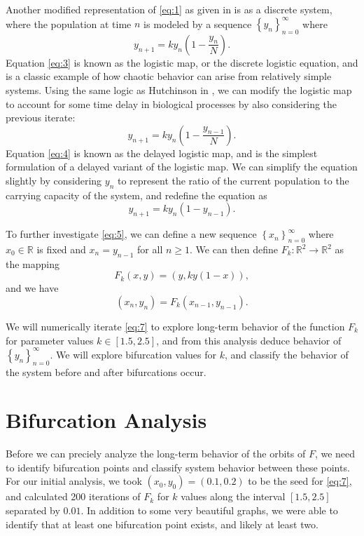 \documentclass[11pt, letterpaper]{article}
\begin{document}
Another modified representation of \eqref{eq:1} as given in \cite{text} is as a discrete system, where the population at time $n$ is modeled by a sequence $\left\{ y_{n} \right\}_{n=0}^\infty $ where
\begin{equation}\label{eq:3}
	y_{n+1}=ky_n\left( 1-\frac{y_n}{N} \right)
.\end{equation}
Equation \eqref{eq:3} is known as the logistic map, or the discrete logistic equation, and is a classic example of how chaotic behavior can arise from relatively simple systems. Using the same logic as Hutchinson in \cite{hutchinson}, we can modify the logistic map to account for some time delay in biological processes by also considering the previous iterate:
\begin{equation}\label{eq:4}
	y_{n+1}=ky_n\left( 1-\frac{y_{n-1}}{N} \right) 
.\end{equation}
Equation \eqref{eq:4} is known as the delayed logistic map, and is the simplest formulation of a delayed variant of the logistic map. We can simplify the equation slightly by considering $y_n$ to represent the ratio of the current population to the carrying capacity of the system, and redefine the equation as
\begin{equation}\label{eq:5}
	y_{n+1}=ky_n\left( 1-y_{n-1} \right) 
.\end{equation}

To further investigate \eqref{eq:5}, we can define a new sequence $\left\{ x_{n} \right\}_{n=0}^\infty $ where $x_0\in\mathbb{R}$ is fixed and $x_{n}=y_{n-1}$ for all $n\geq 1$. We can then define $F_k : \mathbb{R}^2 \to \mathbb{R}^2$ as the mapping
\begin{equation}\label{eq:6}
	F_k(x,y)=\left( y,ky\left( 1-x \right)  \right) 
,\end{equation}
and we have
\begin{equation}\label{eq:7}
	\left( x_n,y_n \right) =F_k(x_{n-1},y_{n-1})
.\end{equation}

We will numerically iterate \eqref{eq:7} to explore long-term behavior of the function $F_k$ for parameter values $k\in[1.5,2.5]$, and from this analysis deduce behavior of $\left\{ y_n \right\}_{n=0}^\infty$. We will explore bifurcation values for $k$, and classify the behavior of the system before and after bifurcations occur.

\section{Bifurcation Analysis}\label{sec:2}
Before we can preciely analyze the long-term behavior of the orbits of $F$, we need to identify bifurcation points and classify system behavior between these points. For our initial analysis, we took $(x_0,y_0)=(0.1,0.2)$ to be the seed for \eqref{eq:7}, and calculated 200 iterations of $F_k$ for $k$ values along the interval $[1.5,2.5]$ separated by $0.01$. In addition to some very beautiful graphs, we were able to identify that at least one bifurcation point exists, and likely at least two.
\end{document}
